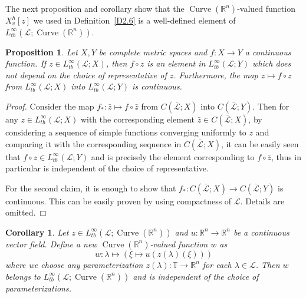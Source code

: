 \documentclass[reqno,centertags,12pt]{amsart}
\newtheorem{proposition}[theorem]{Proposition}
\newtheorem{corollary}[theorem]{Corollary}
\theoremstyle{definition}
\numberwithin{equation}{section}
\newcommand{\bbR}{{\mathbb{R}}}
\newcommand{\bbT}{{\mathbb{T}}}
\begin{document}
The next proposition and corollary show that the $\operatorname{Curve}(\bbR^{n})$-valued
function $X_{v}^{h}[z]$ we used in Definition~\ref{D2.6}
is a well-defined element of $L_{tb}^{\infty}(\mathcal{L};\operatorname{Curve}(\bbR^{n}))$.

\begin{proposition}
    Let $X,Y$ be complete metric spaces and $f\colon X\to Y$ a continuous function.
    If $z\in L_{tb}^{\infty}(\mathcal{L};X)$,
    then $f\circ z$ is an element in $L_{tb}^{\infty}(\mathcal{L};Y)$
    which does not depend on the choice of representative of $z$.
    Furthermore, the map $z\mapsto f\circ z$ from
    $L_{tb}^{\infty}(\mathcal{L};X)$ into $L_{tb}^{\infty}(\mathcal{L};Y)$ is continuous.
\end{proposition}

\begin{proof}
    Consider the map $f_{*}\colon\bar{z}\mapsto f\circ\bar{z}$ from
    $C(\bar{\mathcal{L}};X)$ into $C(\bar{\mathcal{L}};Y)$.
    Then for any $z\in L_{tb}^{\infty}(\mathcal{L};X)$ with the corresponding element
    $\bar{z}\in C(\bar{\mathcal{L}};X)$, by considering a sequence
    of simple functions converging uniformly to $z$ and comparing it with
    the corresponding sequence in $C(\bar{\mathcal{L}};X)$, it can be easily seen that
    $f\circ z\in L_{tb}^{\infty}(\mathcal{L};Y)$ and is precisely the element corresponding
    to $f\circ\bar{z}$, thus in particular is independent of the choice of
    representative.

    For the second claim, it is enough to show that
    $f_{*}\colon C(\bar{\mathcal{L}};X)\to C(\bar{\mathcal{L}};Y)$ is continuous.
    This can be easily proven by using compactness of $\bar{\mathcal{L}}$.
    Details are omitted.
\end{proof}

\begin{corollary}\label{CC.4}
    Let $z\in L_{tb}^{\infty}(\mathcal{L};\operatorname{Curve}(\bbR^{n}))$ and
    $u\colon\bbR^{n}\to\bbR^{n}$ be a continuous vector field.
    Define a new $\operatorname{Curve}(\bbR^{n})$-valued function $w$ as
    \[
        w\colon \lambda\mapsto \left(
            \xi \mapsto u(z(\lambda)(\xi))
        \right)
    \]
    where we choose any parameterization $z(\lambda)\colon\bbT\to\bbR^{n}$
    for each $\lambda\in\mathcal{L}$. Then $w$ belongs to
    $L_{tb}^{\infty}(\mathcal{L};\operatorname{Curve}(\bbR^{n}))$
    and is independent of the choice of parameterizations.
\end{corollary}
\end{document}
